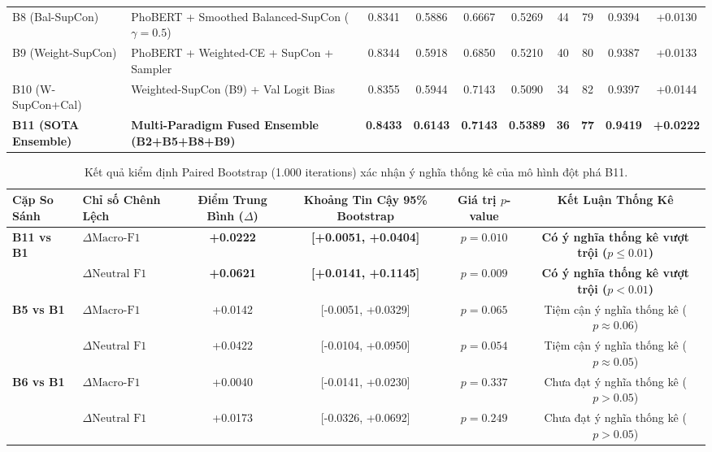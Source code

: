 \documentclass[10pt,journal,compsoc]{IEEEtran}
\begin{document}
\begin{table}[t]
\begin{tabular}{llcccccccc}
B8 (Bal-SupCon) & PhoBERT + Smoothed Balanced-SupCon ($\gamma=0.5$) & 0.8341 & 0.5886 & 0.6667 & 0.5269 & 44 & 79 & 0.9394 & +0.0130 \\
B9 (Weight-SupCon) & PhoBERT + Weighted-CE + SupCon + Sampler & 0.8344 & 0.5918 & 0.6850 & 0.5210 & 40 & 80 & 0.9387 & +0.0133 \\
B10 (W-SupCon+Cal) & Weighted-SupCon (B9) + Val Logit Bias & 0.8355 & 0.5944 & 0.7143 & 0.5090 & 34 & 82 & 0.9397 & +0.0144 \\
\midrule
\textbf{B11 (SOTA Ensemble)} & \textbf{Multi-Paradigm Fused Ensemble (B2+B5+B8+B9)} & \textbf{0.8433} & \textbf{0.6143} & \textbf{0.7143} & \textbf{0.5389} & \textbf{36} & \textbf{77} & \textbf{0.9419} & \textbf{+0.0222} \\
\bottomrule
\end{tabular}
\end{table}

\begin{table}[t]
\centering
\caption{Kết quả kiểm định Paired Bootstrap (1.000 iterations) xác nhận ý nghĩa thống kê của mô hình đột phá B11.}
\label{tab:bootstrap}
\begin{tabular}{llcccc}
\toprule
\textbf{Cặp So Sánh} & \textbf{Chỉ số Chênh Lệch} & \textbf{Điểm Trung Bình ($\Delta$)} & \textbf{Khoảng Tin Cậy 95\% Bootstrap} & \textbf{Giá trị $p$-value} & \textbf{Kết Luận Thống Kê} \\
\midrule
\textbf{B11 vs B1} & $\Delta \text{Macro-F1}$ & \textbf{+0.0222} & \textbf{[+0.0051, +0.0404]} & \textbf{$p = 0.010$} & \textbf{Có ý nghĩa thống kê vượt trội ($p \le 0.01$)} \\
& $\Delta \text{Neutral F1}$ & \textbf{+0.0621} & \textbf{[+0.0141, +0.1145]} & \textbf{$p = 0.009$} & \textbf{Có ý nghĩa thống kê vượt trội ($p < 0.01$)} \\
\midrule
\textbf{B5 vs B1} & $\Delta \text{Macro-F1}$ & +0.0142 & [-0.0051, +0.0329] & $p = 0.065$ & Tiệm cận ý nghĩa thống kê ($p \approx 0.06$) \\
& $\Delta \text{Neutral F1}$ & +0.0422 & [-0.0104, +0.0950] & $p = 0.054$ & Tiệm cận ý nghĩa thống kê ($p \approx 0.05$) \\
\midrule
\textbf{B6 vs B1} & $\Delta \text{Macro-F1}$ & +0.0040 & [-0.0141, +0.0230] & $p = 0.337$ & Chưa đạt ý nghĩa thống kê ($p > 0.05$) \\
& $\Delta \text{Neutral F1}$ & +0.0173 & [-0.0326, +0.0692] & $p = 0.249$ & Chưa đạt ý nghĩa thống kê ($p > 0.05$) \\
\bottomrule
\end{tabular}
\end{table}
\end{document}
